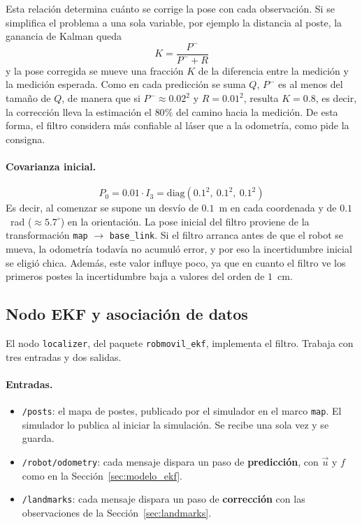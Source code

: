 \documentclass[11pt,a4paper]{article}
\begin{document}
Esta relación determina cuánto se corrige la pose con cada observación. Si se simplifica el problema a una sola variable, por ejemplo la distancia al poste, la ganancia de Kalman queda
\begin{equation}
K = \frac{P^-}{P^- + R}
\end{equation}
y la pose corregida se mueve una fracción $K$ de la diferencia entre la medición y la medición esperada. Como en cada predicción se suma $Q$, $P^-$ es al menos del tamaño de $Q$, de manera que si $P^- \approx 0.02^2$ y $R = 0.01^2$, resulta $K = 0.8$, es decir, la corrección lleva la estimación el $80\%$ del camino hacia la medición. De esta forma, el filtro considera más confiable al láser que a la odometría, como pide la consigna.

\paragraph{Covarianza inicial.}
\begin{equation}
P_0 = 0.01 \cdot I_3 = \mathrm{diag}(0.1^2,\ 0.1^2,\ 0.1^2)
\end{equation}
Es decir, al comenzar se supone un desvío de $0.1$~m en cada coordenada y de $0.1$~rad ($\approx 5.7^\circ$) en la orientación. La pose inicial del filtro proviene de la transformación \texttt{map} $\rightarrow$ \texttt{base\_link}. Si el filtro arranca antes de que el robot se mueva, la odometría todavía no acumuló error, y por eso la incertidumbre inicial se eligió chica. Además, este valor influye poco, ya que en cuanto el filtro ve los primeros postes la incertidumbre baja a valores del orden de $1$~cm.

\subsection{Nodo EKF y asociación de datos}
\label{sec:nodo_ekf}

El nodo \texttt{localizer}, del paquete \texttt{robmovil\_ekf}, implementa el filtro. Trabaja con tres entradas y dos salidas.

\paragraph{Entradas.}
\begin{itemize}
    \item \texttt{/posts}: el mapa de postes, publicado por el simulador en el marco \texttt{map}. El simulador lo publica al iniciar la simulación. Se recibe una sola vez y se guarda.
    \item \texttt{/robot/odometry}: cada mensaje dispara un paso de \textbf{predicción}, con $\vec{u}$ y $f$ como en la Sección~\ref{sec:modelo_ekf}.
    \item \texttt{/landmarks}: cada mensaje dispara un paso de \textbf{corrección} con las observaciones de la Sección~\ref{sec:landmarks}.
\end{itemize}
\end{document}
